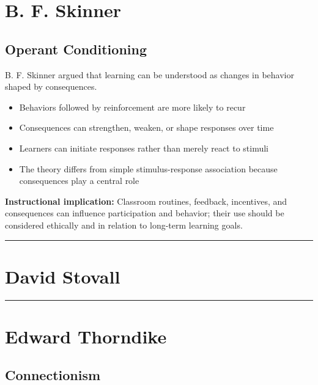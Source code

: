 \documentclass[
  letterpaper,
  DIV=11,
  numbers=noendperiod]{scrartcl}
\providecommand{\tightlist}{%
  \setlength{\itemsep}{0pt}\setlength{\parskip}{0pt}}\usepackage{longtable,booktabs,array}
\begin{document}
\section{B. F. Skinner}\label{b.-f.-skinner}

\subsection{Operant Conditioning}\label{operant-conditioning}

B. F. Skinner argued that learning can be understood as changes in
behavior shaped by consequences.

\begin{itemize}
\tightlist
\item
  Behaviors followed by reinforcement are more likely to recur
\item
  Consequences can strengthen, weaken, or shape responses over time
\item
  Learners can initiate responses rather than merely react to stimuli
\item
  The theory differs from simple stimulus-response association because
  consequences play a central role
\end{itemize}

\textbf{Instructional implication:} Classroom routines, feedback,
incentives, and consequences can influence participation and behavior;
their use should be considered ethically and in relation to long-term
learning goals.

\begin{center}\rule{0.5\linewidth}{0.5pt}\end{center}

\section{David Stovall}\label{david-stovall}

\begin{center}\rule{0.5\linewidth}{0.5pt}\end{center}

\section{Edward Thorndike}\label{edward-thorndike}

\subsection{Connectionism}\label{connectionism}
\end{document}
